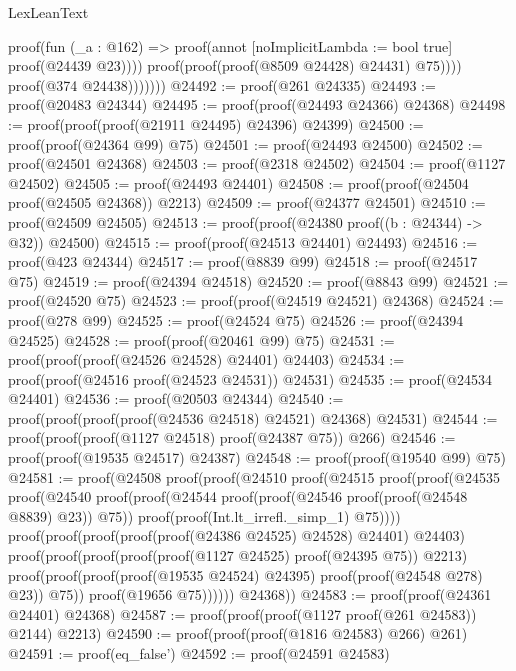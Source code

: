 \begin{lexlean}{LexLeanText}
\begin{coremodule}
                                proof(fun (_a : @162) =>
                                  proof(annot [noImplicitLambda := bool true] proof(@24439 @23))))
                              proof(proof(proof(@8509 @24428) @24431) @75))))
                    proof(@374 @24438)))))))
@24492 := proof(@261 @24335)
@24493 := proof(@20483 @24344)
@24495 := proof(proof(@24493 @24366) @24368)
@24498 := proof(proof(proof(@21911 @24495) @24396) @24399)
@24500 := proof(proof(@24364 @99) @75)
@24501 := proof(@24493 @24500)
@24502 := proof(@24501 @24368)
@24503 := proof(@2318 @24502)
@24504 := proof(@1127 @24502)
@24505 := proof(@24493 @24401)
@24508 := proof(proof(@24504 proof(@24505 @24368)) @2213)
@24509 := proof(@24377 @24501)
@24510 := proof(@24509 @24505)
@24513 := proof(proof(@24380 proof((b : @24344) -> @32)) @24500)
@24515 := proof(proof(@24513 @24401) @24493)
@24516 := proof(@423 @24344)
@24517 := proof(@8839 @99)
@24518 := proof(@24517 @75)
@24519 := proof(@24394 @24518)
@24520 := proof(@8843 @99)
@24521 := proof(@24520 @75)
@24523 := proof(proof(@24519 @24521) @24368)
@24524 := proof(@278 @99)
@24525 := proof(@24524 @75)
@24526 := proof(@24394 @24525)
@24528 := proof(proof(@20461 @99) @75)
@24531 := proof(proof(proof(@24526 @24528) @24401) @24403)
@24534 := proof(proof(@24516 proof(@24523 @24531)) @24531)
@24535 := proof(@24534 @24401)
@24536 := proof(@20503 @24344)
@24540 := proof(proof(proof(proof(@24536 @24518) @24521) @24368) @24531)
@24544 := proof(proof(proof(@1127 @24518) proof(@24387 @75)) @266)
@24546 := proof(proof(@19535 @24517) @24387)
@24548 := proof(proof(@19540 @99) @75)
@24581 := proof(@24508
      proof(proof(@24510
            proof(@24515
                proof(proof(@24535
                      proof(@24540
                          proof(proof(@24544
                                proof(proof(@24546 proof(proof(@24548 @8839) @23)) @75))
                              proof(proof(Int.lt_irrefl._simp_1) @75))))
                    proof(proof(proof(proof(proof(@24386 @24525) @24528) @24401) @24403)
                        proof(proof(proof(proof(proof(@1127 @24525) proof(@24395 @75)) @2213)
                              proof(proof(proof(proof(@19535 @24524) @24395)
                                    proof(proof(@24548 @278) @23))
                                  @75))
                            proof(@19656 @75))))))
          @24368))
@24583 := proof(proof(@24361 @24401) @24368)
@24587 := proof(proof(proof(@1127 proof(@261 @24583)) @2144) @2213)
@24590 := proof(proof(proof(@1816 @24583) @266) @261)
@24591 := proof(eq_false')
@24592 := proof(@24591 @24583)

\end{coremodule}
\end{lexlean}
